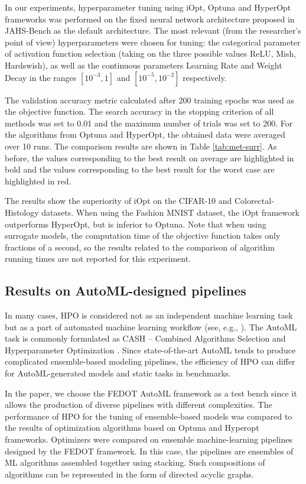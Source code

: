 \documentclass[iicol]{sn-jnl}
\theoremstyle{thmstyleone}%
\theoremstyle{thmstyletwo}%
\theoremstyle{thmstylethree}%
\begin{document}
In our experiments, hyperparameter tuning using iOpt, Optuna and HyperOpt frameworks was performed on the fixed neural network architecture proposed in JAHS-Bench as the default architecture. The most relevant (from the researcher's point of view) hyperparameters were chosen for tuning: the categorical parameter of activation function selection (taking on the three possible values ReLU, Mish, Hardswish), as well as the continuous parameters Learning Rate and Weight Decay in the ranges $[10^{-3},1]$ and $[10^{-5},10^{-2}]$ respectively. 

The validation accuracy metric calculated after 200 training epochs was used as the objective function. The search accuracy in the stopping criterion of all methods was set to 0.01 and the maximum number of trials was set to 200. For the algorithms from Optuna and HyperOpt, the obtained data were averaged over 10 runs. The comparison results are shown in Table \ref{tab:met-surr}. As before, the values corresponding to the best result on average are highlighted in bold and the values corresponding to the best result for the worst case are highlighted in red.

The results show the superiority of iOpt on the CIFAR-10 and Colorectal-Histology datasets. When using the Fashion MNIST dataset, the iOpt framework outperforms HyperOpt, but is inferior to Optuna. Note that when using surrogate models, the computation time of the objective function takes only fractions of a second, so the results related to the comparison of algorithm running times are not reported for this experiment.

\subsection{Results on AutoML-designed pipelines}

In many cases, HPO is considered not as an independent machine learning task but as a part of automated machine learning workflow (see, e.g., \cite{filippou2023structure}). The AutoML task is commonly formulated as CASH -- Combined Algorithms Selection and Hyperparameter Optimization \citep{kim2022survey}. Since state-of-the-art AutoML tends to produce complicated ensemble-based modeling pipelines, the efficiency of HPO can differ for AutoML-generated models and static tasks in benchmarks.

In the paper, we choose the FEDOT AutoML framework \citep{nikitin2022automated} as a test bench since it allows the production of diverse pipelines with different complexities. The performance of HPO for the tuning of ensemble-based models was compared to the results of optimization algorithms based on Optuna and Hyperopt frameworks. Optimizers were compared on ensemble machine-learning pipelines designed by the FEDOT framework. In this case, the pipelines are ensembles of ML algorithms assembled together using stacking. Such compositions of algorithms can be represented in the form of directed acyclic graphs.
\end{document}
